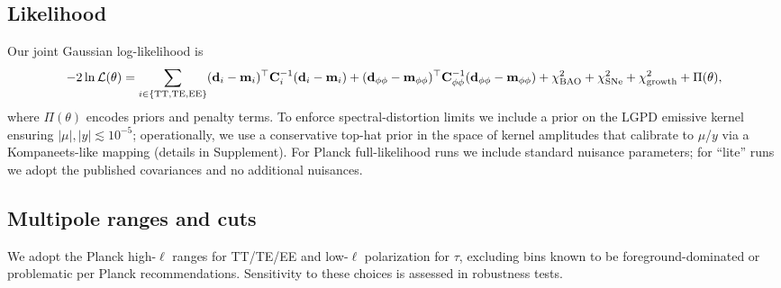 \subsection{Likelihood}
Our joint Gaussian log-likelihood is
\begin{equation}
-2\ln\mathcal{L}(\theta) = \sum_{i\in\{\rm TT,TE,EE\}} (\mathbf{d}_i-\mathbf{m}_i)^\top \mathbf{C}_i^{-1} (\mathbf{d}_i-\mathbf{m}_i)
+ (\mathbf{d}_{\phi\phi}-\mathbf{m}_{\phi\phi})^\top \mathbf{C}_{\phi\phi}^{-1} (\mathbf{d}_{\phi\phi}-\mathbf{m}_{\phi\phi})
+ \chi^2_{\rm BAO} + \chi^2_{\rm SNe} + \chi^2_{\rm growth} + \Pi(\theta),
\end{equation}
where $\Pi(\theta)$ encodes priors and penalty terms. To enforce spectral-distortion limits we include a prior on the LGPD emissive kernel ensuring $|\mu|,|y|\lesssim 10^{-5}$; operationally, we use a conservative top-hat prior in the space of kernel amplitudes that calibrate to $\mu$/$y$ via a Kompaneets-like mapping (details in Supplement). For Planck full-likelihood runs we include standard nuisance parameters; for ``lite'' runs we adopt the published covariances and no additional nuisances.

\subsection{Multipole ranges and cuts}
We adopt the Planck high-$\ell$ ranges for TT/TE/EE and low-$\ell$ polarization for $\tau$, excluding bins known to be foreground-dominated or problematic per Planck recommendations. Sensitivity to these choices is assessed in robustness tests.
